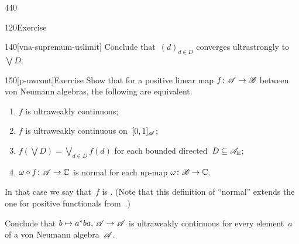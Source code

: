 \begin{parsec}{440}
\begin{point}{120}{Exercise}
\begin{point}{140}[vna-supremum-uslimit]
Conclude that~$(d)_{d\in D}$ converges ultrastrongly to~$\bigvee D$.
\end{point}
\end{point}
\begin{point}{150}[p-uwcont]{Exercise}%
Show that for a positive linear map $f\colon \mathscr{A}\to\mathscr{B}$
between von Neumann algebras,
the following are equivalent.
\begin{enumerate}
\item
$f$ is ultraweakly continuous;
\item
$f$ is ultraweakly continuous on~$[0,1]_{\mathscr{A}}$;
\item
$f(\bigvee D)=\bigvee_{d\in D}f(d)$ for each bounded 
directed~$D\subseteq\mathscr{A}_{\mathbb{R}}$;
\item 
$\omega\circ f\colon \mathscr{A}\to\mathbb{C}$ is normal 
for each np-map $\omega\colon \mathscr{B}\to\mathbb{C}$.
\end{enumerate}
In that case we say that~$f$ is .%
(Note that this definition of ``normal'' extends the one
for positive functionals
from~.)

Conclude that $b\mapsto a^*ba,\,\mathscr{A}\to\mathscr{A}$%
is ultraweakly
continuous for every element~$a$ of a von Neumann 
algebra~$\mathscr{A}$.
\end{point}
\end{parsec}

